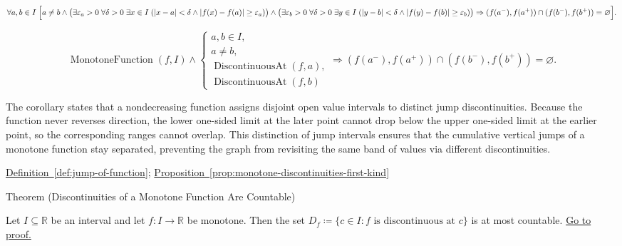 \begin{remark*}
\[
\forall a,b\in I\;
\Bigl[
a\ne b\land
\bigl(\exists \varepsilon_a>0\;\forall \delta>0\;\exists x\in I\;
(|x-a|<\delta\land |f(x)-f(a)|\ge\varepsilon_a)\bigr)\land
\bigl(\exists \varepsilon_b>0\;\forall \delta>0\;\exists y\in I\;
(|y-b|<\delta\land |f(y)-f(b)|\ge\varepsilon_b)\bigr)
\Rightarrow
(f(a^-),f(a^+))\cap(f(b^-),f(b^+))=\varnothing
\Bigr].
\]
\end{remark*}

\begin{remark*}
\[
\operatorname{MonotoneFunction}(f,I)\land
\begin{cases}
a,b\in I,\\
a\neq b,\\
\operatorname{DiscontinuousAt}(f,a),\\
\operatorname{DiscontinuousAt}(f,b)
\end{cases}
\Longrightarrow
(f(a^-),f(a^+))\cap(f(b^-),f(b^+))=\varnothing.
\]
\end{remark*}

\begin{remark*}[Interpretation]
The corollary states that a nondecreasing function assigns disjoint open value intervals to distinct jump discontinuities. Because the function never reverses direction, the lower one-sided limit at the later point cannot drop below the upper one-sided limit at the earlier point, so the corresponding ranges cannot overlap. This distinction of jump intervals ensures that the cumulative vertical jumps of a monotone function stay separated, preventing the graph from revisiting the same band of values via different discontinuities.
\end{remark*}

\begin{dependencies}
\hyperref[def:jump-of-function]{Definition~\ref*{def:jump-of-function}}; \hyperref[prop:monotone-discontinuities-first-kind]{Proposition~\ref*{prop:monotone-discontinuities-first-kind}}
\end{dependencies}

\begin{theorembox}{Theorem (Discontinuities of a Monotone Function Are Countable)}
\begin{theorem}
\label{thm:monotone-discontinuities-countable}
Let $I \subseteq \mathbb{R}$ be an interval and let $f:I\to\mathbb{R}$ be monotone. Then the set $D_f \coloneqq \{c \in I : f \text{ is discontinuous at } c\}$ is at most countable. \hyperref[prf:monotone-discontinuities-countable]{Go to proof.}
\end{theorem}
\end{theorembox}


